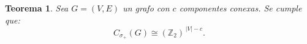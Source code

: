 \documentclass[11pt,a4paper,spanish]{report}
\theoremstyle{plain}
\newtheorem{teorema}{Teorema}[chapter]
\begin{document}
\begin{teorema}\label{ultimo}
Sea \(G=(V,E)\) un grafo con \(c\) componentes conexas. 
Se cumple que:
\[
 C_{\sigma_+}(G)\cong (\mathbb{Z}_2)^{\,|V|-c}.
\]




































































































\end{teorema}
\end{document}
